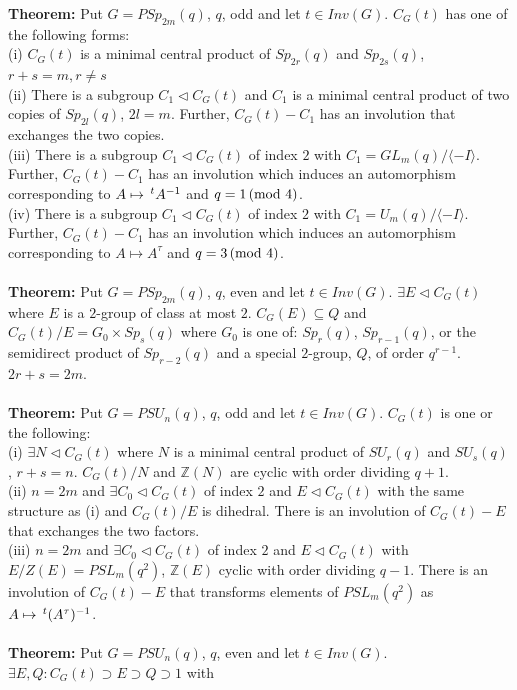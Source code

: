 {\bf Theorem:} Put $G = PSp_{2m}(q)$, $q$, odd and let $t \in Inv(G)$. $C_G(t)$ has one of the following forms:\\
(i) $C_G(t)$ is a minimal central product of $Sp_{2r}(q)$ and $Sp_{2s}(q)$, $r+s=m, r \neq s$\\
(ii) There is a subgroup $C_1 \lhd C_G(t)$ and $C_1$ is a minimal central product of two copies of $Sp_{2l}(q)$, $2l =m$.  Further,
$C_G(t) - C_1$ has an involution that exchanges the two copies.\\
(iii) There is a subgroup $C_1 \lhd C_G(t)$ of index $2$ with $C_1 = GL_m(q)/\langle -I \rangle$.  Further,
$C_G(t) - C_1$ has an involution which induces an automorphism corresponding to $A \mapsto \thinspace^tA^{-1}$ and $q = 1 \thinspace \textnormal{(mod } 4 \textnormal{)}$.
\\
(iv) There is a subgroup $C_1 \lhd C_G(t)$ of index $2$ with $C_1 = U_m(q)/\langle -I \rangle$.  Further,
$C_G(t) - C_1$ has an involution which induces an automorphism corresponding to $A \mapsto A^{\tau}$ and $q = 3 \thinspace \textnormal{(mod } 4 \textnormal{)}$.
\\
\\
{\bf Theorem:} Put $G = PSp_{2m}(q)$, $q$, even and let $t \in Inv(G)$.  $\exists E \lhd C_G(t)$ where $E$ is a $2$-group
of class at most $2$.  $C_G(E) \subseteq Q$ and $C_G(t)/E = G_0 \times Sp_s(q)$ where $G_0$ is one of: $Sp_r(q)$, $Sp_{r-1}(q)$,
or the semidirect product of $Sp_{r-2}(q)$ and a special $2$-group, $Q$, of order $q^{r-1}$.  $2r+s=2m$.
\\
\\
{\bf Theorem:} Put $G = PSU_{n}(q)$, $q$, odd and let $t \in Inv(G)$.  $C_G(t)$ is one or the following:\\
(i) $\exists N \lhd C_G(t)$ where $N$ is a minimal central product of $SU_{r}(q)$ and $SU_{s}(q)$, $r+s=n$.
$C_G(t)/N$ and $\mathbb{Z}(N)$ are cyclic with order dividing $q+1$.
\\
(ii) $n=2m$ and $\exists C_0 \lhd C_G(t)$ of index $2$ and $E \lhd C_G(t)$ with the same structure as (i) and
$C_G(t)/E$ is dihedral.  There is an involution of $C_G(t) - E$ that exchanges the two factors.
\\
(iii) $n=2m$ and $\exists C_0 \lhd C_G(t)$ of index $2$ and $E \lhd C_G(t)$ with $E/Z(E)= PSL_m(q^2)$,
$\mathbb{Z}(E)$ cyclic with order dividing $q-1$.
There is an involution of $C_G(t) - E$ that transforms elements of $PSL_m(q^2)$ as $A \mapsto \thinspace^t(A^{\tau})^{-1}$.
\\
\\
{\bf Theorem:} Put $G = PSU_{n}(q)$, $q$, even and let $t \in Inv(G)$.  $\exists E, Q: C_G(t) \supset E \supset Q \supset 1$ with
